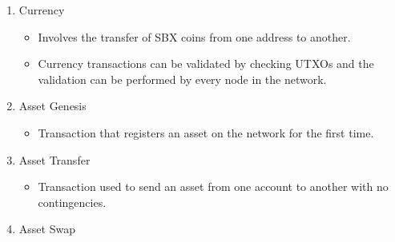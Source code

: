 \documentclass[12pt]{article}
\begin{document}
\begin{enumerate}
	\item Currency
		\begin{itemize}
			\item{Involves the transfer of SBX coins from one address to another.}
			\item{Currency transactions can be validated by checking UTXOs and the
				validation can be performed by every node in the network.}
		\end{itemize}
	\item Asset Genesis
		\begin{itemize}
			\item{Transaction that registers an asset on the network for the first time.}
		\end{itemize}
	\item Asset Transfer
		\begin{itemize}
			\item{Transaction used to send an asset from one account to another
				with no contingencies.}
		\end{itemize}
	\item Asset Swap
		\begin{itemize}
				

\end{itemize}
\end{enumerate}
\end{document}
